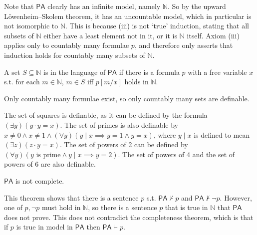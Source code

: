 Note that $\mathsf{PA}$ clearly has an infinite model, namely $\mathbb N$.
So by the upward L\"owenheim--Skolem theorem, it has an uncountable model, which in particular is not isomorphic to $\mathbb N$.
This is because (iii) is not `true' induction, stating that all subsets of $\mathbb N$ either have a least element not in it, or it is $\mathbb N$ itself.
Axiom (iii) applies only to countably many formulae $p$, and therefore only asserts that induction holds for countably many subsets of $\mathbb N$.
\begin{definition}
    A set $S \subseteq \mathbb N$ is  in the language of $\mathsf{PA}$ if there is a formula $p$ with a free variable $x$ s.t. for each $m \in \mathbb N$, $m \in S$ iff $p[m/x]$ holds in $\mathbb N$.
\end{definition}
Only countably many formulae exist, so only countably many sets are definable.
\begin{example}
    The set of squares is definable, as it can be defined by the formula $(\exists y)(y\cdot y = x)$.
    The set of primes is also definable by $x \neq 0 \wedge x \neq 1 \wedge (\forall y)(y \mid x \implies y = 1 \wedge y = x)$, where $y \mid x$ is defined to mean $(\exists z)(z \cdot y = x)$.
    The set of powers of 2 can be defined by $(\forall y)(y \text{ is prime} \wedge y \mid x \implies y = 2)$.
    The set of powers of 4 and the set of powers of 6 are also definable.
\end{example}
\begin{theorem}
    $\mathsf{PA}$ is not complete.
\end{theorem}
This theorem shows that there is a sentence $p$ s.t. $\mathsf{PA} \not\vdash p$ and $\mathsf{PA} \not\vdash \neg p$.
However, one of $p, \neg p$ must hold in $\mathbb N$, so there is a sentence $p$ that is true in $\mathbb N$ that $\mathsf{PA}$ does not prove.
This does not contradict the completeness theorem, which is that if $p$ is true in  model in $\mathsf{PA}$ then $\mathsf{PA} \vdash p$.
